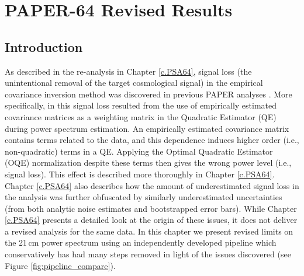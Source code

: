 \newcommand{\upperlims}{$(1440$ mK$)^{2}$, $(1850$ mK$)^{2}$, $(290$ mK$)^{2}$, $(190$ mK$)^{2}$, $(360$ mK$)^{2}$, $(290$ mK$)^{2}$ at redshifts $z=10.87,\ 9.93,\ 8.68,\ 8.37,\  8.13,$ and $7.48$, respectively}
\newcommand{\hMpci}{h\ {\rm Mpc}^{-1}}

\chapter{PAPER-64 Revised Results}
\label{c.PSA64_results}

\section{Introduction}

As described in the re-analysis in Chapter \ref{c.PSA64}, signal loss (the
unintentional removal of the target cosmological signal) in the empirical covariance
inversion method was discovered in previous PAPER analyses \citep{ali_et_al2018}. More specifically, in  this signal loss resulted from the use of empirically estimated covariance
matrices as a weighting matrix in the Quadratic Estimator (QE)
during power spectrum estimation.
An empirically estimated covariance matrix contains
terms related to the data, and this dependence induces higher order (i.e., non-quadratic) terms in a QE.
Applying the Optimal Quadratic Estimator (OQE) normalization despite these terms then gives the
wrong power level (i.e., signal loss). This effect is described
more thoroughly in Chapter \ref{c.PSA64}.
Chapter \ref{c.PSA64} also describes how the amount of underestimated signal loss
in the  analysis was further obfuscated by similarly underestimated uncertainties (from both analytic noise estimates and bootstrapped error bars). While Chapter \ref{c.PSA64} presents a detailed look
at the origin of these issues, it does not deliver a revised analysis for the same data. In this chapter we present revised limits on the 21\,cm power spectrum using an independently developed pipeline which conservatively has had many steps removed in light of the issues discovered (see Figure \ref{fig:pipeline_compare}).

